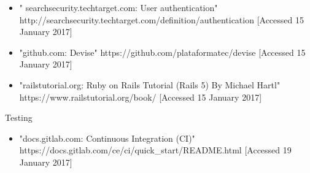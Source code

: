 \documentclass{l3proj}
\begin{document}
\begin{itemize}

\item " searchsecurity.techtarget.com: User authentication"
\newline http://searchsecurity.techtarget.com/definition/authentication [Accessed 15 January 2017]

\item "github.com: Devise"
\newline https://github.com/plataformatec/devise [Accessed 15 January 2017]

\item "railstutorial.org: Ruby on Rails Tutorial (Rails 5) By Michael Hartl"
\newline https://www.railstutorial.org/book/ [Accessed 15 January 2017]

\end{itemize}

\label{testing}

Testing

\begin{itemize}

\item "docs.gitlab.com: Continuous Integration (CI)" 
\newline https://docs.gitlab.com/ce/ci/quick\_start/README.html [Accessed 19 January 2017]

\end{itemize}
\end{document}
